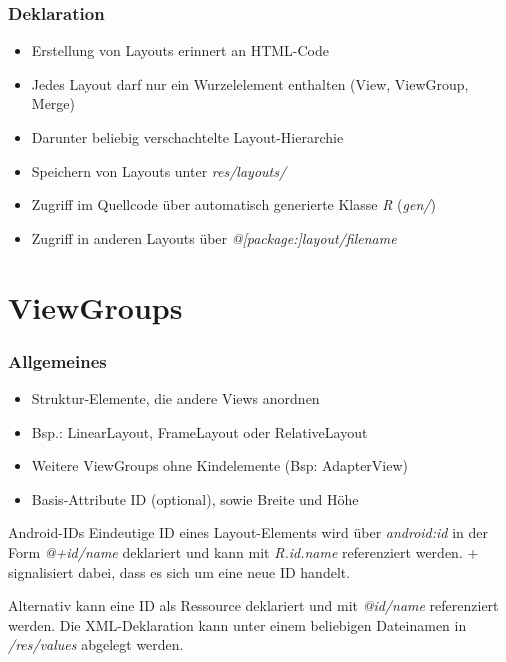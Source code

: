 \begin{frame}
   \frametitle{Deklaration}
   \begin{itemize}
      \item Erstellung von Layouts erinnert an HTML-Code
      \item Jedes Layout darf nur ein Wurzelelement enthalten 
         (View, ViewGroup, Merge)
      \item Darunter beliebig verschachtelte Layout-Hierarchie
      \item Speichern von Layouts unter \emph{res/layouts/}
      \item Zugriff im Quellcode über automatisch generierte Klasse \emph{R} (\emph{gen/})
      \item Zugriff in anderen Layouts über \emph{@[package:]layout/filename}
   \end{itemize}
\end{frame}

\section{ViewGroups}
\begin{frame}
   \frametitle{Allgemeines}
   \begin{itemize}
      \item Struktur-Elemente, die andere Views anordnen
      \item Bsp.: LinearLayout, FrameLayout oder RelativeLayout
      \item Weitere ViewGroups ohne Kindelemente (Bsp: AdapterView)
      \item Basis-Attribute ID (optional), sowie Breite und Höhe
   \end{itemize}

   \begin{alertblock}{Android-IDs}
      Eindeutige ID eines Layout-Elements wird über \emph{android:id} 
      in der Form \emph{@+id/name} deklariert und kann mit \emph{R.id.name} 
      referenziert werden. + signalisiert dabei, dass es sich 
      um eine neue ID handelt.
      
      \vspace{3mm}

      Alternativ kann eine ID als Ressource deklariert und mit \emph{@id/name} 
      referenziert werden. Die XML-Deklaration kann unter einem beliebigen 
      Dateinamen in \emph{/res/values} abgelegt werden.\\

      
   \end{alertblock}
\end{frame}

